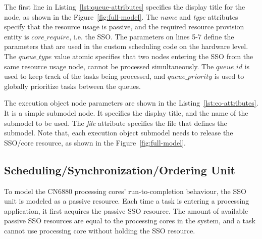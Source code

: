 

The first line in Listing~\ref{lst:queue-attributes} specifies the display title for the node, as shown in the Figure~\ref{fig:full-model}. The \emph{name} and \emph{type} attributes specify that the resource usage is passive, and the required resource provision entity is $core\_require$, i.e. the SSO. The parameters on lines 5-7 define the parameters that are used in the custom scheduling code on the hardware level. The \emph{$queue\_type$} value atomic specifies that two nodes entering the SSO from the same resource usage node, cannot be processed simultaneously. The \emph{$queue\_id$} is used to keep track of the tasks being processed, and \emph{$queue\_priority$} is used to globally prioritize tasks between the queues.



The execution object node parameters are shown in the Listing~\ref{lst:eo-attributes}. It is a simple submodel node. It specifies the display title, and the name of the submodel to be used. The \emph{file} attribute specifies the file that defines the submodel. Note that, each execution object submodel needs to release the SSO/core resource, as shown in the Figure~\ref{fig:full-model}.

\subsection{Scheduling/Synchronization/Ordering Unit}
\label{sec:SSO-unit}
To model the CN6880 processing cores' run-to-completion behaviour, the SSO unit is modeled as a passive resource. Each time a task is entering a processing application, it first acquires the passive SSO resource. The amount of available passive SSO resources are equal to the processing cores in the system, and a task cannot use processing core without holding the SSO resource.


